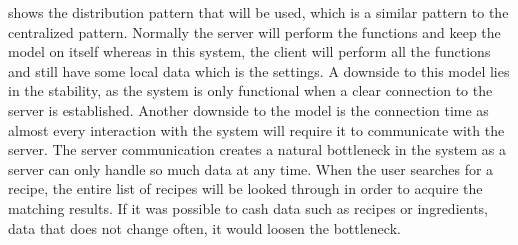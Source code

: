  shows the distribution pattern that will be used, which is a similar pattern to the centralized pattern. Normally the server will perform the functions and keep the model on itself whereas in this system, the client will perform all the functions and still have some local data which is the settings. A downside to this model lies in the stability, as the system is only functional when a clear connection to the server is established. Another downside to the model is the connection time as almost every interaction with the system will require it to communicate with the server. The server communication creates a natural bottleneck in the system as a server can only handle so much data at any time. When the user searches for a recipe, the entire list of recipes will be looked through in order to acquire the matching results. If it was possible to cash data such as recipes or ingredients, data that does not change often, it would loosen the bottleneck.